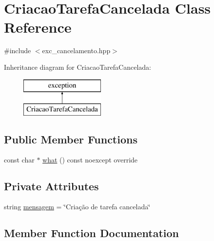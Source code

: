 \hypertarget{classCriacaoTarefaCancelada}{}\section{Criacao\+Tarefa\+Cancelada Class Reference}
\label{classCriacaoTarefaCancelada}


{\ttfamily \#include $<$exc\+\_\+cancelamento.\+hpp$>$}

Inheritance diagram for Criacao\+Tarefa\+Cancelada\+:\begin{figure}[H]
\begin{center}
\leavevmode
\includegraphics[height=2.000000cm]{classCriacaoTarefaCancelada}
\end{center}
\end{figure}
\subsection*{Public Member Functions}
\begin{DoxyCompactItemize}
\item 
const char $\ast$ \hyperlink{classCriacaoTarefaCancelada_aad818f5b62b134079ed47908825d52c9}{what} () const noexcept override
\end{DoxyCompactItemize}
\subsection*{Private Attributes}
\begin{DoxyCompactItemize}
\item 
string \hyperlink{classCriacaoTarefaCancelada_a8c861f898009f0691f033ecf83f4351f}{mensagem} = \char`\"{}Criação de tarefa cancelada\char`\"{}
\end{DoxyCompactItemize}


\subsection{Member Function Documentation}
\mbox{\label{classCriacaoTarefaCancelada_aad818f5b62b134079ed47908825d52c9}} 

